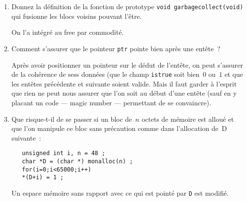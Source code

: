 \begin{enumerate}
\begin{correction}
\begin{verbatim}
  freelist_t **pt,*entete = (freelist_t *) ((char *) ptr - sizeof(freelist_t)) ;
  
  entete->isfree = TRUE ;

  if(entete->next && (entete->next)->isfree == TRUE){
    /* Si la fusion avec la cellule suivante est possible, on y va */
    entete->size += entete->next->size ;
    entete->next = entete->next->next ;
    return ;
  }
  
  if(entete->previous && (entete->previous)->isfree == TRUE){
    /* Si la fusion avec la cellule pr\'ec\'edente est possible, on y va */
    entete->previous->size += entete->size ;
    entete->previous->next = entete->next ;
    return ;
  }
  
  /* sinon, on l'ins\`ere \`a la bonne place dans la liste */

  pt = Head ;
  while(pt->next>entete)
    pt=pt->next ;

  entete->next=pt->next ;
  pt->next=entete ;

  return ;

}
\end{verbatim}
\end{correction}
\fi
\item Donnez la d\'efinition de la fonction de prototype %
  \verb+void garbagecollect(void)+ qui fusionne les blocs voisins
  pouvant l'\^etre.
\ifcorrection
\begin{correction}
  On l'a int\'egr\'e au free par commodit\'e.
\end{correction}
\fi
\item Comment s'assurer que le pointeur \verb+ptr+ pointe bien apr\`es
  une ent\^ete~?
\ifcorrection
\begin{correction}
  Apr\`es avoir positionner un pointeur sur le d\'edut de l'ent\^ete,
  on peut s'assurer de la coh\'erence de sess donn\'ees (que le champ
  \verb+istrue+ soit bien~$0$ ou~$1$ et que les ent\^etes
  pr\'ec\'edente et suivante soient valide. Mais il faut garder \`a
  l'esprit que rien ne peut nous assurer que l'on soit au d\'ebut
  d'une ent\^ete (sauf en y placant un code --- magic number ---
  permettant de se convaincre).
\end{correction}
\fi
\item Que risque-t-il de se passer si un bloc de~$n$ octets de
  m\'emoire est allou\'e et que l'on manipule ce bloc sans
  pr\'ecaution comme dans l'allocation de~D suivante~:
\begin{verbatim}
   unsigned int i, n = 48 ; 
   char *D = (char *) monalloc(n) ;
   for(i=0;i<65000;i++)
   *(D+i) = 1 ;
\end{verbatim}
\ifcorrection
Un espace m\'emoire sans rapport avec ce qui est point\'e par
\texttt{D} est modifi\'e.
\fi
\end{enumerate}
